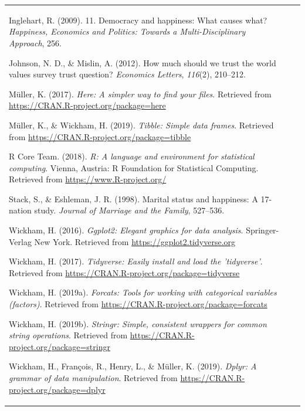 \documentclass[man, fleqn, noextraspace,floatsintext]{apa6}
\begin{document}
\begin{tabular}{l|l|r}
\leavevmode\hypertarget{ref-inglehart200911}{}%
Inglehart, R. (2009). 11. Democracy and happiness: What causes what? \emph{Happiness, Economics and Politics: Towards a Multi-Disciplinary Approach}, 256.

\leavevmode\hypertarget{ref-johnson2012much}{}%
Johnson, N. D., \& Mislin, A. (2012). How much should we trust the world values survey trust question? \emph{Economics Letters}, \emph{116}(2), 210--212.

\leavevmode\hypertarget{ref-R-here}{}%
Müller, K. (2017). \emph{Here: A simpler way to find your files}. Retrieved from \url{https://CRAN.R-project.org/package=here}

\leavevmode\hypertarget{ref-R-tibble}{}%
Müller, K., \& Wickham, H. (2019). \emph{Tibble: Simple data frames}. Retrieved from \url{https://CRAN.R-project.org/package=tibble}

\leavevmode\hypertarget{ref-R-base}{}%
R Core Team. (2018). \emph{R: A language and environment for statistical computing}. Vienna, Austria: R Foundation for Statistical Computing. Retrieved from \url{https://www.R-project.org/}

\leavevmode\hypertarget{ref-stack1998marital}{}%
Stack, S., \& Eshleman, J. R. (1998). Marital status and happiness: A 17-nation study. \emph{Journal of Marriage and the Family}, 527--536.

\leavevmode\hypertarget{ref-R-ggplot2}{}%
Wickham, H. (2016). \emph{Ggplot2: Elegant graphics for data analysis}. Springer-Verlag New York. Retrieved from \url{https://ggplot2.tidyverse.org}

\leavevmode\hypertarget{ref-R-tidyverse}{}%
Wickham, H. (2017). \emph{Tidyverse: Easily install and load the 'tidyverse'}. Retrieved from \url{https://CRAN.R-project.org/package=tidyverse}

\leavevmode\hypertarget{ref-R-forcats}{}%
Wickham, H. (2019a). \emph{Forcats: Tools for working with categorical variables (factors)}. Retrieved from \url{https://CRAN.R-project.org/package=forcats}

\leavevmode\hypertarget{ref-R-stringr}{}%
Wickham, H. (2019b). \emph{Stringr: Simple, consistent wrappers for common string operations}. Retrieved from \url{https://CRAN.R-project.org/package=stringr}

\leavevmode\hypertarget{ref-R-dplyr}{}%
Wickham, H., François, R., Henry, L., \& Müller, K. (2019). \emph{Dplyr: A grammar of data manipulation}. Retrieved from \url{https://CRAN.R-project.org/package=dplyr}


\end{tabular}
\end{document}
